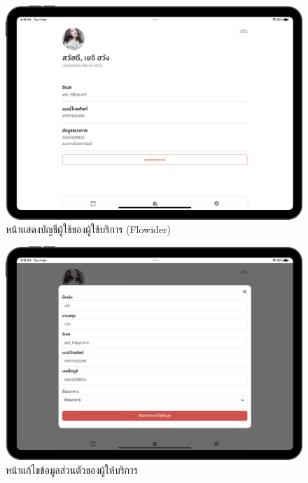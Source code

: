 \begin{figure}[ht]
    \begin{center}
    \includegraphics[width=5.5in]{./image/Flowider_account.png}
    \end{center}
    \caption[Flowider account]{หน้าแสดงบัญชีผู้ใช้ของผู้ใช้บริการ (Flowider)}
    \label{fig:Flowider_account}
\end{figure}
\begin{figure}[ht]
    \begin{center}
    \includegraphics[width=5.5in]{./image/Flowider_edit_account.png}
    \end{center}
    \caption[Flowider edit account]{หน้าแก้ไขข้อมูลส่วนตัวของผู้ให้บริการ}
    \label{fig:Flowider_edit_account}
\end{figure}

